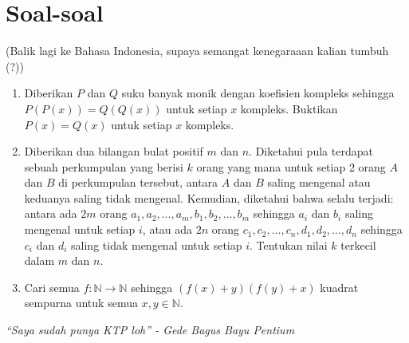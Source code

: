 \documentclass{article}
\begin{document}
	\section{Soal-soal}
	(Balik lagi ke Bahasa Indonesia, supaya semangat kenegaraaan kalian tumbuh (?))
	\vspace{1em}
	\begin{enumerate}
		\item Diberikan $P$ dan $Q$ suku banyak monik dengan koefisien kompleks sehingga $P(P(x)) = Q(Q(x))$ untuk setiap $x$ kompleks. Buktikan $P(x) = Q(x)$ untuk setiap $x$ kompleks.
		\item Diberikan dua bilangan bulat positif $m$ dan $n$. Diketahui pula terdapat sebuah perkumpulan yang berisi $k$ orang yang mana untuk setiap 2 orang $A$ dan $B$ di perkumpulan tersebut, antara $A$ dan $B$ saling mengenal atau keduanya saling tidak mengenal. Kemudian, diketahui bahwa selalu terjadi: antara ada $2m$ orang $a_1, a_2, \dotsc, a_m, b_1, b_2, \dotsc, b_m$ sehingga $a_i$ dan $b_i$ saling mengenal untuk setiap $i$, atau ada $2n$ orang $c_1, c_2, \dotsc, c_n, d_1, d_2, \dotsc, d_n$ sehingga $c_i$ dan $d_i$ saling tidak mengenal untuk setiap $i$. Tentukan nilai $k$ terkecil dalam $m$ dan $n$.
		\item Cari semua $f: \mathbb{N} \to \mathbb{N}$ sehingga $(f(x) + y)(f(y) + x)$ kuadrat sempurna untuk semua $x, y \in \mathbb{N}$.
	\end{enumerate}
	\begin{center}
		\textit{``Saya sudah punya KTP loh'' - Gede Bagus Bayu Pentium}
	\end{center}
\end{document}
